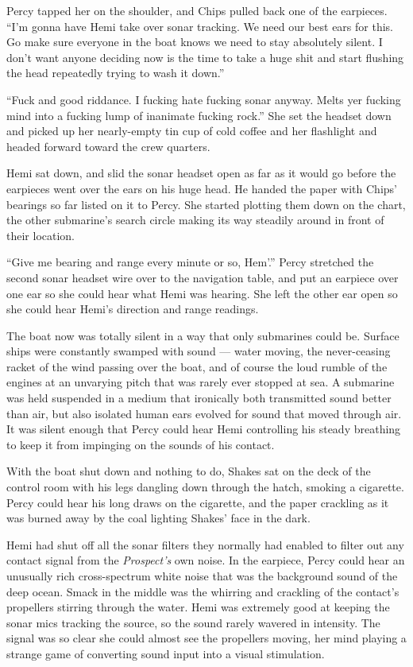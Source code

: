 \documentclass[]{scrbook}
\begin{document}
Percy tapped her on the shoulder, and Chips pulled back one of the
earpieces. ``I'm gonna have Hemi take over sonar tracking. We need our
best ears for this. Go make sure everyone in the boat knows we need to
stay absolutely silent. I don't want anyone deciding now is the time to
take a huge shit and start flushing the head repeatedly trying to wash
it down.''

``Fuck and good riddance. I fucking hate fucking sonar anyway. Melts yer
fucking mind into a fucking lump of inanimate fucking rock.'' She set
the headset down and picked up her nearly-empty tin cup of cold coffee
and her flashlight and headed forward toward the crew quarters.

Hemi sat down, and slid the sonar headset open as far as it would go
before the earpieces went over the ears on his huge head. He handed the
paper with Chips' bearings so far listed on it to Percy. She started
plotting them down on the chart, the other submarine's search circle
making its way steadily around in front of their location.

``Give me bearing and range every minute or so, Hem'.'' Percy stretched
the second sonar headset wire over to the navigation table, and put an
earpiece over one ear so she could hear what Hemi was hearing. She left
the other ear open so she could hear Hemi's direction and range
readings.

The boat now was totally silent in a way that only submarines could be.
Surface ships were constantly swamped with sound --- water moving, the
never-ceasing racket of the wind passing over the boat, and of course
the loud rumble of the engines at an unvarying pitch that was rarely
ever stopped at sea. A submarine was held suspended in a medium that
ironically both transmitted sound better than air, but also isolated
human ears evolved for sound that moved through air. It was silent
enough that Percy could hear Hemi controlling his steady breathing to
keep it from impinging on the sounds of his contact.

With the boat shut down and nothing to do, Shakes sat on the deck of the
control room with his legs dangling down through the hatch, smoking a
cigarette. Percy could hear his long draws on the cigarette, and the
paper crackling as it was burned away by the coal lighting Shakes' face
in the dark.

Hemi had shut off all the sonar filters they normally had enabled to
filter out any contact signal from the \emph{Prospect's} own noise. In
the earpiece, Percy could hear an unusually rich cross-spectrum white
noise that was the background sound of the deep ocean. Smack in the
middle was the whirring and crackling of the contact's propellers
stirring through the water. Hemi was extremely good at keeping the sonar
mics tracking the source, so the sound rarely wavered in intensity. The
signal was so clear she could almost see the propellers moving, her mind
playing a strange game of converting sound input into a visual
stimulation.
\end{document}
